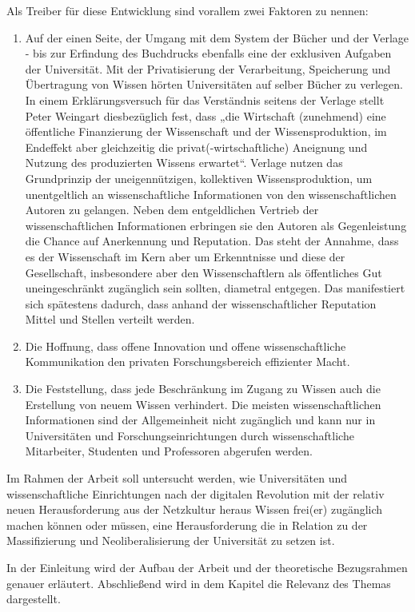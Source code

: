 Als Treiber für diese Entwicklung sind vorallem zwei Faktoren zu nennen: 
\begin{enumerate}
\item Auf der einen Seite, der Umgang mit dem System der Bücher und der Verlage - bis zur Erfindung des Buchdrucks ebenfalls eine der exklusiven Aufgaben der Universität. Mit der Privatisierung der Verarbeitung, Speicherung und Übertragung von Wissen hörten Universitäten auf selber Bücher zu verlegen. In einem Erklärungsversuch für das Verständnis seitens der Verlage stellt Peter Weingart diesbezüglich fest, dass „die Wirtschaft (zunehmend) eine öffentliche Finanzierung der Wissenschaft und der Wissensproduktion, im Endeffekt aber gleichzeitig die privat(-wirtschaftliche) Aneignung und Nutzung des produzierten Wissens erwartet“\cite{cite:2}. Verlage nutzen das Grundprinzip der uneigennützigen, kollektiven Wissensproduktion, um unentgeltlich an wissenschaftliche Informationen von den wissenschaftlichen Autoren zu gelangen. Neben dem entgeldlichen Vertrieb der wissenschaftlichen Informationen erbringen sie den Autoren als Gegenleistung die Chance auf Anerkennung und Reputation. Das steht der Annahme, dass es der Wissenschaft im Kern aber um Erkenntnisse und diese der Gesellschaft, insbesondere aber den Wissenschaftlern als öffentliches Gut uneingeschränkt zugänglich sein sollten\cite{cite:3}, diametral entgegen. Das manifestiert sich spätestens dadurch, dass anhand der wissenschaftlicher Reputation Mittel und Stellen verteilt werden\cite{cite:4}.
\item Die Hoffnung, dass offene Innovation und offene wissenschaftliche Kommunikation den privaten Forschungsbereich effizienter Macht.
\item Die Feststellung, dass jede Beschränkung im Zugang zu Wissen auch die Erstellung von neuem Wissen verhindert\cite{cite:5}.  Die meisten wissenschaftlichen Informationen sind der Allgemeinheit nicht zugänglich und kann nur in Universitäten und Forschungseinrichtungen durch wissenschaftliche Mitarbeiter, Studenten und Professoren abgerufen werden\cite{cite:6}. 
\end{enumerate}	

Im Rahmen der Arbeit soll untersucht werden, wie Universitäten und wissenschaftliche Einrichtungen nach der digitalen Revolution mit der relativ neuen Herausforderung aus der Netzkultur heraus Wissen frei(er) zugänglich machen können oder müssen, eine Herausforderung die in Relation zu der Massifizierung und Neoliberalisierung der Universität zu setzen ist.

In der Einleitung wird der Aufbau der Arbeit und der theoretische Bezugsrahmen genauer erläutert. Abschließend wird in dem Kapitel die Relevanz des Themas dargestellt.
